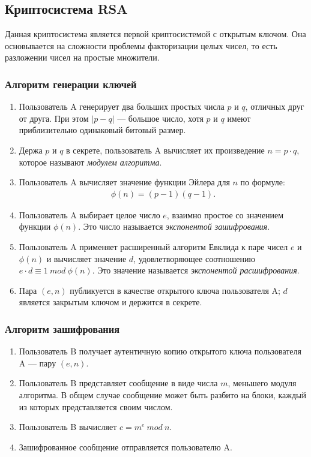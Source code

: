\subsection{Криптосистема RSA}
Данная криптосистема является первой криптосистемой с открытым ключом. Она основывается на сложности проблемы факторизации целых чисел, то есть разложении чисел на простые множители.

\subsubsection*{Алгоритм генерации ключей}
\begin{enumerate}
    \item Пользователь A генерирует два больших простых числа $p$ и $q$, отличных друг от друга. При этом $|p-q|$ —  большое число, хотя $p$ и $q$ имеют приблизительно одинаковый битовый размер.
    \item Держа $p$ и $q$ в секрете, пользователь A вычисляет их произведение $n = p \cdot q$, которое называют \textit{модулем алгоритма}.
    \item Пользователь A вычисляет значение функции Эйлера для $n$ по формуле: \begin{align*}
        \phi(n) = (p-1)(q-1).
    \end{align*}
    \item Пользователь A выбирает целое число $e$, взаимно простое со значением функции $\phi(n)$. Это число называется \textit{экспонентой зашифрования}.
    \item Пользователь A применяет расширенный алгоритм Евклида к паре чисел $e$ и $\phi(n)$ и вычисляет значение $d$, удовлетворяющее соотношению $e \cdot d \equiv 1 \ mod \ \phi(n)$. Это значение называется \textit{экспонентой расшифрования}.
    \item Пара $(e, n)$ публикуется в качестве открытого ключа пользователя A;  $d$ является закрытым ключом и держится в секрете.
\end{enumerate}

\subsubsection*{Алгоритм зашифрования}
\begin{enumerate}
    \item Пользователь B получает аутентичную копию открытого ключа пользователя A — пару $(e, n)$.
    \item Пользователь B представляет сообщение в виде числа $m$, меньшего модуля алгоритма. В общем случае сообщение может быть разбито на блоки, каждый из которых представляется своим числом.
    \item Пользователь B вычисляет $c = m^e \ mod \ n$.
    \item Зашифрованное сообщение отправляется пользователю A.
\end{enumerate}

